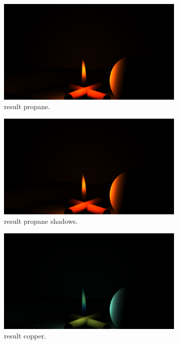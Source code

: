 \begin{figure}[htbp!]
	\centering
	\includegraphics[width=0.8\textwidth, trim={8cm 0 8cm 10cm}, clip]{img/result_propane}
	\caption{result propane.}
	\label{fig:result_propane}
\end{figure}

\begin{figure}[htbp!]
	\centering
	\includegraphics[width=0.8\textwidth, trim={8cm 0 8cm 10cm}, clip]{img/result_propane_shadows}
	\caption{result propane shadows.}
	\label{fig:result_propane_shadows}
\end{figure}

\begin{figure}[htbp!]
	\centering
	\includegraphics[width=0.8\textwidth, trim={8cm 0 8cm 10cm}, clip]{img/result_copper}
	\caption{result copper.}
	\label{fig:result_copper}
\end{figure}

